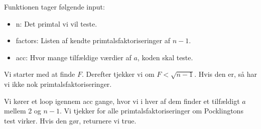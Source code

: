 Funktionen tager følgende input:
\begin{itemize}
	\item n: Det primtal vi vil teste.
	\item factors: Listen af kendte primtalsfaktoriseringer af $n-1$.
	\item acc: Hvor mange tilfældige værdier af $a$, koden skal teste.
\end{itemize}

Vi starter med at finde $F$. Derefter tjekker vi om $F<\sqrt{n-1}$. Hvis
den er, så har vi ikke nok primtalsfaktoriseringer.

Vi kører et loop igennem acc gange, hvor vi i hver af dem finder et
tilfældigt $a$ mellem 2 og $n-1$. Vi tjekker for alle
primtalsfaktoriseringer om Pocklingtons test virker. Hvis den gør,
returnere vi true.


